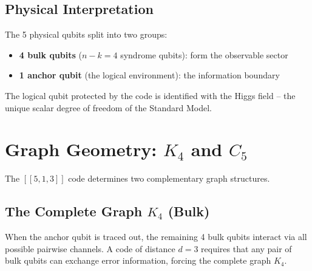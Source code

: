 \documentclass[11pt,a4paper]{article}
\theoremstyle{definition}
\begin{document}
\subsection{Physical Interpretation}

The 5 physical qubits split into two groups:
\begin{itemize}[nosep]
    \item \textbf{4 bulk qubits} ($n - k = 4$ syndrome qubits): form the observable sector
    \item \textbf{1 anchor qubit} (the logical environment): the information boundary
\end{itemize}
The logical qubit protected by the code is identified with the Higgs field -- the unique scalar degree of freedom of the Standard Model.

\section{Graph Geometry: $K_4$ and $C_5$}
\label{sec:graphs}

The $[[5,1,3]]$ code determines two complementary graph structures.

\subsection{The Complete Graph $K_4$ (Bulk)}

When the anchor qubit is traced out, the remaining 4 bulk qubits interact via all possible pairwise channels. A code of distance $d = 3$ requires that any pair of bulk qubits can exchange error information, forcing the complete graph $K_4$.
\end{document}
